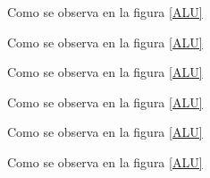 Como se observa en la figura \ref{ALU}


Como se observa en la figura \ref{ALU}


Como se observa en la figura \ref{ALU}


Como se observa en la figura \ref{ALU}


Como se observa en la figura \ref{ALU}



Como se observa en la figura \ref{ALU}





